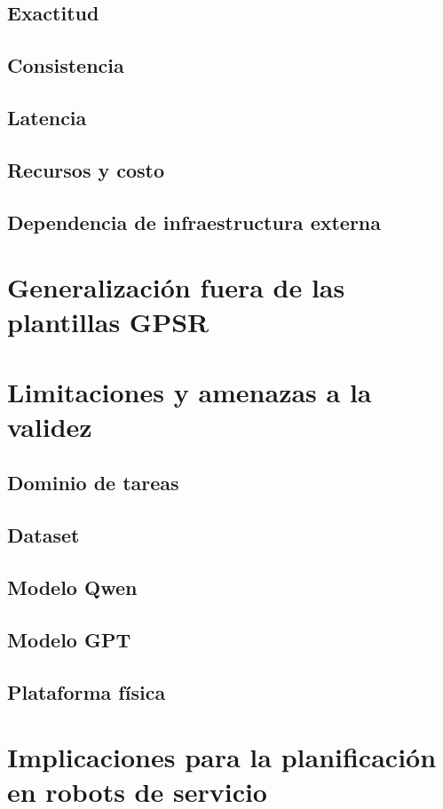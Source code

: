 \subsection{Exactitud}

\subsection{Consistencia}

\subsection{Latencia}

\subsection{Recursos y costo}

\subsection{Dependencia de infraestructura externa}


\section{Generalización fuera de las plantillas GPSR}


\section{Limitaciones y amenazas a la validez}

\subsection{Dominio de tareas}

\subsection{Dataset}

\subsection{Modelo Qwen}

\subsection{Modelo GPT}

\subsection{Plataforma física}


\section{Implicaciones para la planificación en robots de servicio}